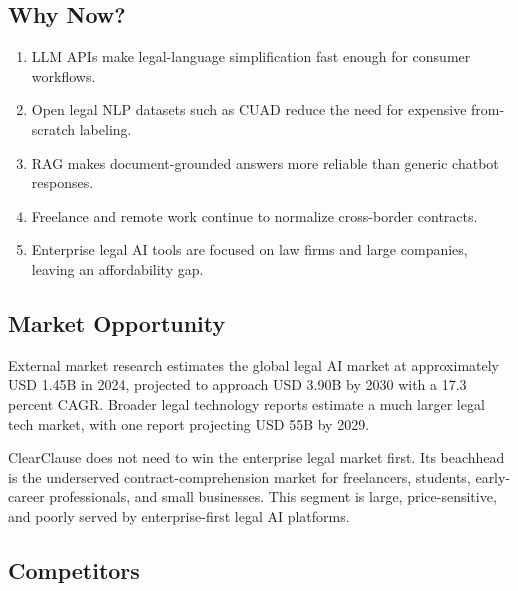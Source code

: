 \documentclass[11pt,a4paper]{article}
\begin{document}
\subsection{Why Now?}

\begin{enumerate}
\item LLM APIs make legal-language simplification fast enough for consumer workflows.
\item Open legal NLP datasets such as CUAD reduce the need for expensive from-scratch labeling.
\item RAG makes document-grounded answers more reliable than generic chatbot responses.
\item Freelance and remote work continue to normalize cross-border contracts.
\item Enterprise legal AI tools are focused on law firms and large companies, leaving an affordability gap.
\end{enumerate}

\subsection{Market Opportunity}

External market research estimates the global legal AI market at approximately USD 1.45B in 2024, projected to approach USD 3.90B by 2030 with a 17.3 percent CAGR. Broader legal technology reports estimate a much larger legal tech market, with one report projecting USD 55B by 2029.

ClearClause does not need to win the enterprise legal market first. Its beachhead is the underserved contract-comprehension market for freelancers, students, early-career professionals, and small businesses. This segment is large, price-sensitive, and poorly served by enterprise-first legal AI platforms.

\subsection{Competitors}
\end{document}
